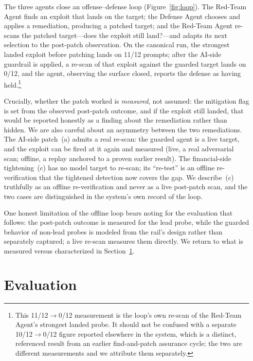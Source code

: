 \documentclass[10pt,twocolumn]{article}
\begin{document}
The three agents close an offense--defense loop (Figure~\ref{fig:loop}). The Red-Team Agent finds an
exploit that lands on the target; the Defense Agent chooses and applies a
remediation, producing a patched target; and the Red-Team Agent re-scans the
patched target---does the exploit still land?---and adapts its next selection to
the post-patch observation. On the canonical run, the strongest landed exploit
before patching lands on 11/12 prompts; after the AI-side guardrail is
applied, a re-scan of that exploit against the guarded target lands on 0/12,
and the agent, observing the surface closed, reports the defense as
having held.\footnote{This 11/12$\rightarrow$0/12 measurement is the loop's own
re-scan of the Red-Team Agent's strongest landed probe. It should not be confused
with a separate 10/12$\rightarrow$0/12 figure reported elsewhere in the system,
which is a distinct, referenced result from an earlier find-and-patch assurance
cycle; the two are different measurements and we attribute them separately.}

Crucially, whether the patch worked is \emph{measured}, not assumed: the
mitigation flag is set from the observed post-patch outcome, and if the exploit
still landed, that would be reported honestly as a finding about the remediation
rather than hidden. We are also careful about an asymmetry between the two
remediations. The AI-side patch~(a) admits a real re-scan: the guarded agent is a
live target, and the exploit can be fired at it again and measured (live, a real
adversarial scan; offline, a replay anchored to a proven earlier result). The
financial-side tightening~(c) has no model target to re-scan; its ``re-test'' is
an offline re-verification that the tightened detection now covers the gap. We
describe~(c) truthfully as an offline re-verification and never as a live
post-patch scan, and the two cases are distinguished in the system's own record
of the loop.

One honest limitation of the offline loop bears noting for the evaluation that
follows: the post-patch outcome is measured for the lead probe, while the
guarded behavior of non-lead probes is modeled from the rail's design rather than
separately captured; a live re-scan measures them directly. We return to what is
measured versus characterized in Section~\ref{sec:eval}.



\section{Evaluation}\label{sec:eval}
\end{document}
